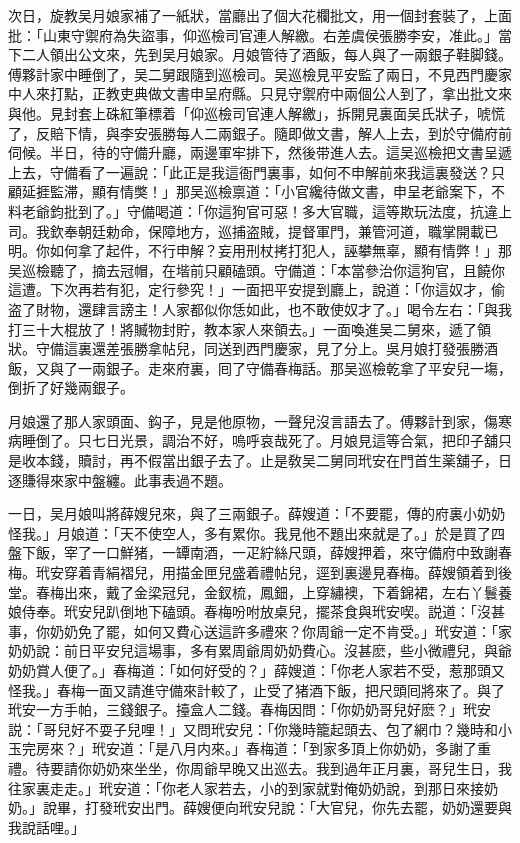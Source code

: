次日，旋教吴月娘家補了一紙狀，當廳出了個大花欄批文，用一個封套裝了，上面批：「山東守禦府為失盜事，仰巡檢司官連人解繳。右差虞侯張勝李安，准此。」當下二人領出公文來，先到吴月娘家。月娘管待了酒飯，每人與了一兩銀子鞋脚錢。傅夥計家中睡倒了，吴二舅跟隨到巡檢司。吴巡檢見平安監了兩日，不見西門慶家中人來打點，正教吏典做文書申呈府縣。只見守禦府中兩個公人到了，拿出批文來與他。見封套上硃紅筆標着「仰巡檢司官連人解繳」，拆開見裏面吴氏狀子，唬慌了，反賠下情，與李安張勝每人二兩銀子。隨即做文書，解人上去，到於守備府前伺候。半日，待的守備升廳，兩邊軍牢排下，然後带進人去。這吴巡檢把文書呈遞上去，守備看了一遍說：「此正是我這衙門裏事，如何不申解前來我這裏發送？只顧延捱監滞，顯有情獘！」那吴巡檢禀道：「小官纔待做文書，申呈老爺案下，不料老爺鈞批到了。」守備喝道：「你這狗官可惡！多大官職，這等欺玩法度，抗違上司。我欽奉朝廷勅命，保障地方，巡捕盗賊，提督軍門，兼管河道，職掌開載已明。你如何拿了起件，不行申解？妄用刑杖拷打犯人，誣攀無辜，顯有情弊！」那吴巡檢聽了，摘去冠帽，在堦前只顧磕頭。守備道：「本當參治你這狗官，且饒你這遭。下次再若有犯，定行參究！」一面把平安提到廳上，說道：「你這奴才，偷盗了財物，還肆言謗主！人家都似你恁如此，也不敢使奴才了。」喝令左右：「與我打三十大棍放了！將贓物封貯，教本家人來領去。」一面喚進吴二舅來，遞了領狀。守備這裏還差張勝拿帖兒，同送到西門慶家，見了分上。吳月娘打發張勝酒飯，又與了一兩銀子。走來府裏，囘了守備春梅話。那吴巡檢乾拿了平安兒一塲，倒折了好幾兩銀子。

月娘還了那人家頭面、鈎子，見是他原物，一聲兒沒言語去了。傅夥計到家，傷寒病睡倒了。只七日光景，調治不好，嗚呼哀哉死了。月娘見這等合氣，把印子舖只是收本錢，贖討，再不假當出銀子去了。止是敎吴二舅同玳安在門首生薬舖子，日逐賺得來家中盤纏。此事表過不題。

一日，吴月娘叫將薛嫂兒來，與了三兩銀子。薛嫂道：「不要罷，傳的府裏小奶奶怪我。」月娘道：「天不使空人，多有累你。我見他不題出來就是了。」於是買了四盤下飯，宰了一口鮮猪，一罈南酒，一疋紵絲尺頭，薛嫂押着，來守備府中致謝春梅。玳安穿着青絹褶兒，用描金匣兒盛着禮帖兒，逕到裏邊見春梅。薛嫂領着到後堂。春梅出來，戴了金梁冠兒，金釵梳，鳳鈿，上穿繡襖，下着錦裙，左右丫鬟養娘侍奉。玳安兒趴倒地下磕頭。春梅吩咐放桌兒，擺茶食與玳安喫。説道：「沒甚事，你奶奶免了罷，如何又費心送這許多禮來？你周爺一定不肯受。」玳安道：「家奶奶說：前日平安兒這場事，多有累周爺周奶奶費心。沒甚麽，些小微禮兒，與爺奶奶賞人便了。」春梅道：「如何好受的？」薛嫂道：「你老人家若不受，惹那頭又怪我。」春梅一面又請進守備來計較了，止受了猪酒下飯，把尺頭囘將來了。與了玳安一方手帕，三錢銀子。擡盒人二錢。春梅因問：「你奶奶哥兒好麽？」玳安説：「哥兒好不耍子兒哩！」又問玳安兒：「你幾時籠起頭去、包了網巾？幾時和小玉完房來？」玳安道：「是八月内來。」春梅道：「到家多頂上你奶奶，多謝了重禮。待要請你奶奶來坐坐，你周爺早晚又出巡去。我到過年正月裏，哥兒生日，我往家裏走走。」玳安道：「你老人家若去，小的到家就對俺奶奶說，到那日來接奶奶。」說畢，打發玳安出門。薛嫂便向玳安兒說：「大官兒，你先去罷，奶奶還要與我說話哩。」

